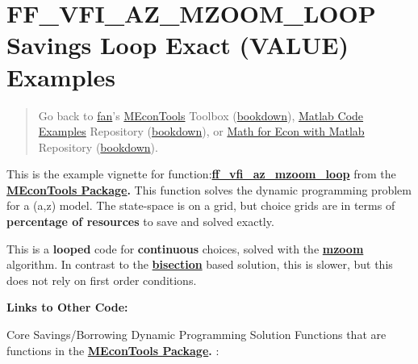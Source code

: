 \documentclass[
]{book}
\begin{document}
\hypertarget{ff_vfi_az_mzoom_loop-savings-loop-exact-value-examples}{%
\section{FF\_VFI\_AZ\_MZOOM\_LOOP Savings Loop Exact (VALUE) Examples}\label{ff_vfi_az_mzoom_loop-savings-loop-exact-value-examples}}

\begin{quote}
Go back to \href{http://fanwangecon.github.io/}{fan}'s \href{https://fanwangecon.github.io/MEconTools/}{MEconTools} Toolbox (\href{https://fanwangecon.github.io/MEconTools/bookdown}{bookdown}), \href{https://fanwangecon.github.io/M4Econ/}{Matlab Code Examples} Repository (\href{https://fanwangecon.github.io/M4Econ/bookdown}{bookdown}), or \href{https://fanwangecon.github.io/Math4Econ/}{Math for Econ with Matlab} Repository (\href{https://fanwangecon.github.io/Math4Econ/bookdown}{bookdown}).
\end{quote}

This is the example vignette for function:\href{https://github.com/FanWangEcon/MEconTools/blob/master/MEconTools/vfi/ff_vfi_az_mzoom_loop.m}{\textbf{ff\_vfi\_az\_mzoom\_loop}}
from the \href{https://fanwangecon.github.io/MEconTools/}{\textbf{MEconTools
Package}}\textbf{.} This function
solves the dynamic programming problem for a (a,z) model. The
state-space is on a grid, but choice grids are in terms of \textbf{percentage
of resources} to save and solved exactly.

This is a \textbf{looped} code for \textbf{continuous} choices, solved with the
\href{https://fanwangecon.github.io/MEconTools/MEconTools/doc/optim/htmlpdfm/fx_optim_mzoom_savezrone.html}{\textbf{mzoom}}
algorithm. In contrast to the
\href{https://fanwangecon.github.io/MEconTools/MEconTools/doc/optim/htmlpdfm/fx_optim_bisec_savezrone.html}{\textbf{bisection}}
based solution, this is slower, but this does not rely on first order
conditions.

\textbf{Links to Other Code:}

Core Savings/Borrowing Dynamic Programming Solution Functions that are
functions in the \href{https://fanwangecon.github.io/MEconTools/}{\textbf{MEconTools
Package}}\textbf{.} :
\end{document}

